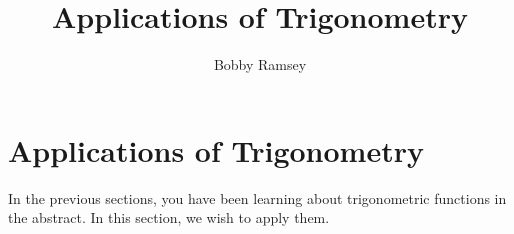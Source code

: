 \documentclass[nooutcomes]{ximera}
\author{Bobby Ramsey}
\title{Applications of Trigonometry}
\begin{document}
\begin{abstract}
	
\end{abstract}
\maketitle




\section{Applications of Trigonometry}

In the previous sections, you have been learning about trigonometric functions in the abstract. In this section, we wish to apply them.
\end{document}

